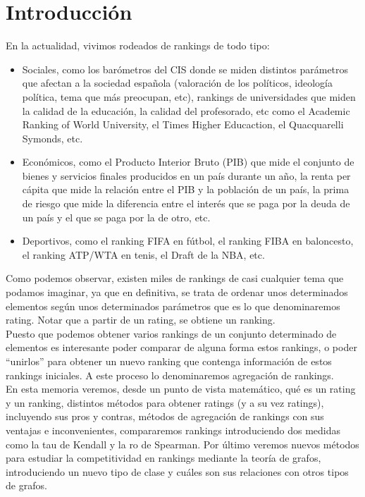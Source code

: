 \chapter{Introducción} \label{chp:introduccion}


En la actualidad, vivimos rodeados de rankings de todo tipo: 
\begin{itemize}
\item Sociales, como los barómetros del CIS donde se miden distintos parámetros que afectan a la sociedad española (valoración de los políticos, ideología política, tema que más preocupan, etc), rankings de universidades que miden la calidad de la educación, la calidad del profesorado, etc como el Academic Ranking of World University, el Times Higher Educaction, el Quacquarelli Symonds, etc.
\item Económicos, como el Producto Interior Bruto (PIB) que mide el conjunto de bienes y servicios finales producidos en un país durante un año, la renta per cápita que mide la relación entre el PIB y la población de un país, la prima de riesgo que mide la diferencia entre el interés que se paga por la deuda de un país y el que se paga por la de otro, etc.
\item Deportivos, como el ranking FIFA en fútbol, el ranking FIBA en baloncesto, el ranking ATP/WTA en tenis, el Draft de la NBA, etc.
\end{itemize}

Como podemos observar, existen miles de rankings de casi cualquier tema que podamos imaginar, ya que en definitiva, se trata de ordenar unos determinados elementos según unos determinados parámetros que es lo que denominaremos rating. Notar que a partir de un rating, se obtiene un ranking.\\

Puesto que podemos obtener varios rankings de un conjunto determinado de elementos es interesante poder comparar de alguna forma estos rankings, o poder ``unirlos'' para obtener un nuevo ranking que contenga información de estos rankings iniciales. A este proceso lo denominaremos agregación de rankings.\\

En esta memoria veremos, desde un punto de vista matemático, qué es un rating y un ranking, distintos métodos para obtener ratings (y a su vez ratings), incluyendo sus pros y contras, métodos de agregación de rankings con sus ventajas e inconvenientes, compararemos rankings introduciendo dos medidas como la tau de Kendall y la ro de Spearman. Por último veremos nuevos métodos para estudiar la competitividad en rankings mediante la teoría de grafos, introduciendo un nuevo tipo de clase y cuáles son sus relaciones con otros tipos de grafos.
